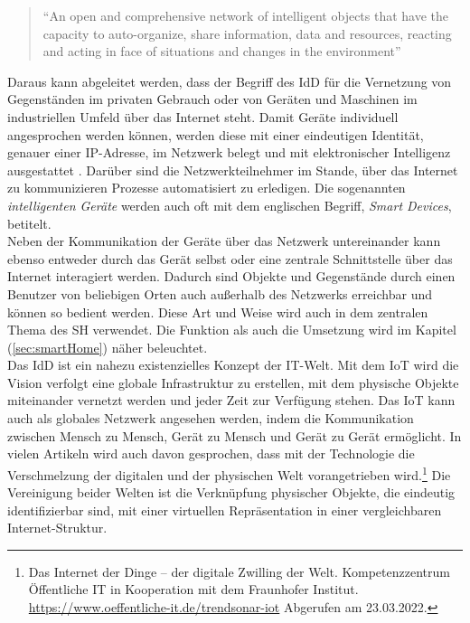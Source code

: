     \pagebreak
    \begin{quote}
        “An open and comprehensive network of intelligent objects that have the capacity to auto-organize, share information, data 
        and resources, reacting and acting in face of situations and changes in the environment” \cite{Madakam2015}
    \end{quote}
    Daraus kann abgeleitet werden, dass der Begriff des \acl{IdD} für die Vernetzung von Gegenständen im privaten Gebrauch oder 
    von Geräten und Maschinen im industriellen Umfeld über das Internet steht. Damit Geräte individuell angesprochen werden können, werden diese 
    mit einer eindeutigen Identität, genauer einer \ac{IP}-Adresse, im Netzwerk belegt und mit elektronischer Intelligenz ausgestattet \cite{bigdatainsider2016}.
    Darüber sind die Netzwerkteilnehmer im Stande, über das Internet zu kommunizieren Prozesse automatisiert zu erledigen. Die sogenannten 
    \textit{intelligenten Geräte} werden auch oft mit dem englischen Begriff, \textit{Smart Devices}, betitelt. 
    \\
    \linebreak
    Neben der Kommunikation der Geräte über das Netzwerk untereinander kann ebenso entweder durch das Gerät selbst oder eine zentrale 
    Schnittstelle über das Internet interagiert werden. Dadurch sind Objekte und Gegenstände durch einen Benutzer von beliebigen Orten 
    auch außerhalb des Netzwerks erreichbar und können so bedient werden. Diese Art und Weise wird auch in dem zentralen Thema des 
    \acl{SH} verwendet. Die Funktion als auch die Umsetzung wird im Kapitel (\ref{sec:smartHome}) näher beleuchtet.
    \\
    \linebreak
    Das \acl{IdD} ist ein nahezu existenzielles Konzept der \acs{IT}-Welt. Mit dem \acs{IoT} wird die Vision verfolgt eine globale 
    Infrastruktur zu erstellen, mit dem physische Objekte miteinander vernetzt werden und jeder Zeit zur Verfügung stehen. Das \acl{IoT} 
    kann auch als globales Netzwerk angesehen werden, indem die Kommunikation zwischen Mensch zu Mensch, Gerät zu Mensch und Gerät zu 
    Gerät ermöglicht. In vielen Artikeln wird auch davon gesprochen, dass mit der Technologie die Verschmelzung der digitalen und 
    der physischen Welt vorangetrieben wird.\footnote{Das Internet der Dinge – der digitale Zwilling der Welt. Kompetenzzentrum Öffentliche IT in Kooperation mit dem Fraunhofer Institut. \url{https://www.oeffentliche-it.de/trendsonar-iot} Abgerufen am 23.03.2022.} 
    Die Vereinigung beider Welten ist die Verknüpfung physischer Objekte, die eindeutig identifizierbar sind, mit einer virtuellen 
    Repräsentation in einer vergleichbaren Internet-Struktur. 

